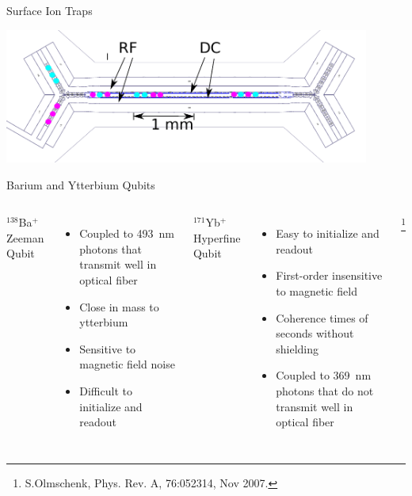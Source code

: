 \documentclass{beamer}
\begin{document}
\begin{frame}{Surface Ion Traps}
	\centerline{\includegraphics[width=0.9\textwidth]{HOA-ions}}
\end{frame}

\begin{frame}{Barium and Ytterbium Qubits}
\begin{columns}[T]
	\centerline{$^{138}$Ba$^+$ Zeeman Qubit}
	\begin{itemize}
		\item Coupled to 493~nm photons that transmit well in optical fiber
		\item Close in mass to ytterbium
		\hfill \break
		\item Sensitive to magnetic field noise
		\item Difficult to initialize and readout
	\end{itemize}
	\centerline{$^{171}$Yb$^+$ Hyperfine Qubit}
	\begin{itemize}
		\item Easy to initialize and readout
		\item First-order insensitive to magnetic field
		\item Coherence times of seconds without shielding
		\hfill \break
		\item Coupled to 369~nm photons that do not transmit well in optical fiber
	\end{itemize}
\let\thefootnote\relax\footnote[frame]{S.Olmschenk, Phys. Rev. A, 76:052314, Nov 2007.}
\end{columns}


\end{frame}
\end{document}
